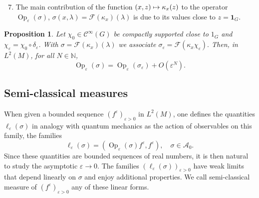\documentclass[JEP,XML,SOM,Unicode,published]{cedram}
\let\mathcal\mathscr
\newcommand\mto{\mathchoice{\longmapsto}{\mapsto}{\mapsto}{\mapsto}}
\newcommand{\bun}{\mathbf{1}}
\DeclareMathOperator{\Op}{Op}
\theoremstyle{plain}
\newtheorem{proposition}[theorem]{Proposition}
\theoremstyle{definition}
\let\eps\varepsilon
\def\N{{\mathbb N}}
\begin{document}
\begin{enumerate}\setcounter{enumi}{6}
\item\label{fact:7}
The main contribution of the function $(x,z)\mto \kappa_x (z)$ to the operator $\Op_\eps(\sigma)$, $\sigma(x,\lambda)=\mathcal F (\kappa_x) (\lambda) $ is due to its values close to $z=\bun_G$.
\end{enumerate}

\begin{proposition} \label{prop:cutoffkernel}
Let $\chi_0\in{\mathcal C}^\infty(G)$ be compactly supported close to $1_G$ and $\chi_\eps=\chi_0\circ \delta_\eps$. With $\sigma =\mathcal F (\kappa_x) (\lambda) $ we associate
$\sigma_\eps = \mathcal F (\kappa_x \chi_\eps).$
Then, in $L^2(M)$, for all $N\in\N$,
\[
\Op_\eps (\sigma)=\Op_\eps (\sigma_\eps) +O(\eps^{N}).
\]
\end{proposition}

\subsection{Semi-classical measures}\label{s:sclmeas}
When given a bounded sequence $(f^\eps)_{\eps>0}$ in $L^2(M)$, one defines the quantities $\ell_\eps(\sigma)$ in analogy with quantum mechanics as the action of observables on this family, \ie the families
\[
\ell_\eps(\sigma)= \left(\Op_\eps(\sigma) f^\eps,f^\eps\right),\quad \sigma\in \mathcal A_0.
\]
Since these quantities are bounded sequences of real numbers, it is then natural to study the asymptotic $\eps\to 0$. The families $(\ell_\eps(\sigma))_{\eps>0}$ have weak limits that depend linearly on $\sigma$ and enjoy additional properties. We call semi-classical measure of $(f^\eps)_{\eps>0}$ any of these linear forms.
\end{document}
